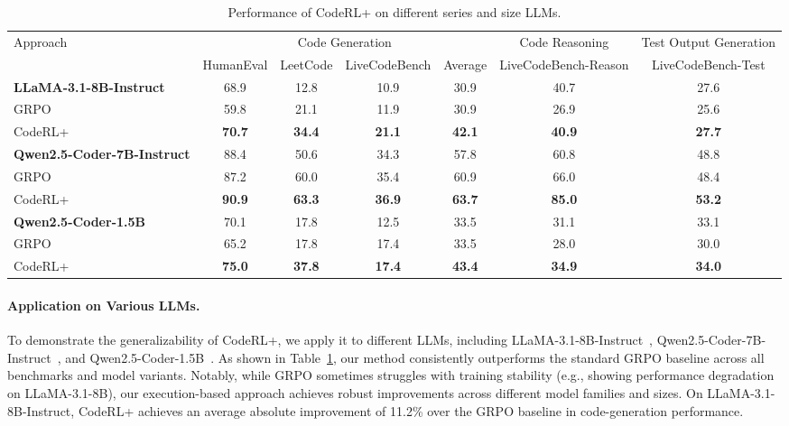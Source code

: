 \documentclass{article}
\DeclareRobustCommand{\ourapproach}{{\sc CodeRL+}\xspace}
\theoremstyle{definition}
\theoremstyle{remark}
\begin{document}
\begin{table}[t!]
\centering
\caption{Performance of \ourapproach on different series and size LLMs.}
\resizebox{\textwidth}{!}
{
\begin{tabular}{lcccccc}
\toprule
\multirow{2}{*}{Approach} & \multicolumn{4}{c}{Code Generation} & Code Reasoning & Test Output Generation \\ \cmidrule(r){2-5} \cmidrule(r){6-6} \cmidrule(r){7-7}
 & HumanEval & LeetCode & LiveCodeBench & Average & LiveCodeBench-Reason & LiveCodeBench-Test \\
\midrule
\textbf{LLaMA-3.1-8B-Instruct} & 68.9 & 12.8 & 10.9 & 30.9 & 40.7 & 27.6 \\
GRPO & 59.8 & 21.1 & 11.9 & 30.9 & 26.9 & 25.6 \\
\ourapproach & \textbf{70.7} & \textbf{34.4} & \textbf{21.1} & \textbf{42.1} & \textbf{40.9} & \textbf{27.7} \\
\hdashline
\textbf{Qwen2.5-Coder-7B-Instruct} & 88.4 & 50.6 & 34.3 & 57.8 & 60.8 & 48.8\\
GRPO & 87.2 & 60.0 & 35.4 & 60.9 & 66.0 & 48.4 \\
\ourapproach &\textbf{90.9} & \textbf{63.3} & \textbf{36.9} & \textbf{63.7} & \textbf{85.0} & \textbf{53.2}\\
\hdashline
\textbf{Qwen2.5-Coder-1.5B} &70.1  &17.8  & 12.5 & 33.5 & 31.1 & 33.1 \\
GRPO & 65.2 & 17.8 & 17.4 & 33.5 & 28.0 & 30.0 \\
\ourapproach & \textbf{75.0} & \textbf{37.8} & \textbf{17.4} & \textbf{43.4} & \textbf{34.9} & \textbf{34.0} \\
\bottomrule
\end{tabular}}\label{tab:diff_LLMs}
\end{table}





\paragraph{Application on Various LLMs.}
To demonstrate the generalizability of \ourapproach, we apply it to different LLMs, including LLaMA-3.1-8B-Instruct~\citep{llama31}, Qwen2.5-Coder-7B-Instruct~\citep{hui2024qwen2}, and Qwen2.5-Coder-1.5B~\citep{hui2024qwen2}. As shown in Table~\ref{tab:diff_LLMs}, our method consistently outperforms the standard GRPO baseline across all benchmarks and model variants. Notably, while GRPO sometimes struggles with training stability (e.g., showing performance degradation on LLaMA-3.1-8B), our execution-based approach achieves robust improvements across different model families and sizes. On LLaMA-3.1-8B-Instruct, \ourapproach achieves an average absolute improvement of 11.2\% over the GRPO baseline in code-generation performance.
\end{document}
